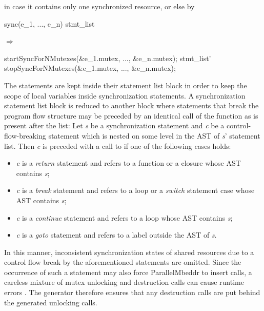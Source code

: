 in case it contains only one synchronized resource, or else by

\begin{center}
\begin{minipage}{0.3\textwidth}
\begin{ccode}
sync(e_1, ..., e_n) stmt_list
\end{ccode}
\end{minipage}
\qquad$\Longrightarrow$\qquad\qquad\qquad
\begin{minipage}{0.4\textwidth}
\begin{ccode}
startSyncForNMutexes(&e_1.mutex, ..., &e_n.mutex);
stmt_list'
stopSyncForNMutexes(&e_1.mutex, ..., &e_n.mutex);
\end{ccode}
\end{minipage}
\end{center}

The statements are kept inside their statement list block in order to keep the scope of local variables inside synchronization statements. A synchronization statement list block is reduced to another block where statements that break the program flow structure may be preceded by an identical call of the  function as is present after the list: Let \textit{s} be a synchronization statement and \textit{c} be a control-flow-breaking statement which is nested on some level in the AST of \textit{s}' statement list. Then \textit{c} is preceded with a call to  if one of the following cases holds:
\begin{itemize}
\item \textit{c} is a \textit{return} statement and refers to a function or a closure whose AST contains \textit{s};
\item \textit{c} is a \textit{break} statement and refers to a loop or a \textit{switch} statement case whose AST contains \textit{s};
\item \textit{c} is a \textit{continue} statement and refers to a loop whose AST contains \textit{s};
\item \textit{c} is a \textit{goto} statement and refers to a label outside the AST of \textit{s}.
\end{itemize}

In this manner, inconsistent synchronization states of shared resources due to a control flow break by the aforementioned statements are omitted. Since the occurrence of such a statement may also force ParallelMbeddr to insert  calls, a careless mixture of mutex unlocking and destruction calls can cause runtime errors \cite{Mutexes}. The generator therefore ensures that any destruction calls are put behind the generated unlocking calls.

